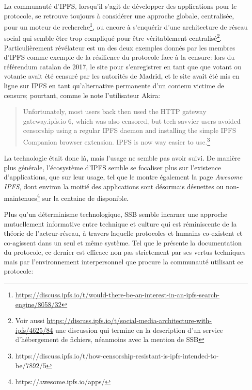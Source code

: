 \documentclass{article}
\begin{document}
La communauté d'IPFS, lorsqu'il s'agit de développer des applications pour le protocole, se retrouve toujours à considérer une approche globale, centralisée, pour un moteur de recherche\footnote{\url{https://discuss.ipfs.io/t/would-there-be-an-interest-in-an-ipfs-search-engine/8058/32}}, ou encore à s'enquérir d'une architecture de réseau social qui semble être trop compliqué pour être véritablement centralisé\footnote{Voir aussi \url{https://discuss.ipfs.io/t/social-media-architecture-with-ipfs/4625/84} une discussion qui termine en la description d'un service d'hébergement de fichiers, néanmoins avec la mention de SSB}. Particulièrement révélateur est un des deux exemples donnés par les membres d'IPFS comme exemple de la résilience du protocole face à la censure: lors du référendum catalan de 2017, le site pour s'enregistrer en tant que que votant ou votante avait été censuré par les autorités de Madrid, et le site avait été mis en ligne sur IPFS en tant qu'alternative permanente d'un contenu victime de censure; pourtant, comme le note l'utilisateur Akira:

\begin{quote}
    Unfortunately, most users back then used the HTTP gateway gateway.ipfs.io 6, which was also censored, but tech-savvier users avoided censorship using a regular IPFS daemon and installing the simple IPFS Companion browser extension. IPFS is now way easier to use.\footnote{https://discuss.ipfs.io/t/how-censorship-resistant-is-ipfs-intended-to-be/7892/5}
\end{quote}

La technologie était donc là, mais l'usage ne semble pas avoir suivi. De manière plus générale, l'écosystème d'IPFS semble se focaliser plus sur l'existence d'applications, que sur leur usage, tel que le montre également la page \emph{Awesome IPFS}, dont environ la moitié des applications sont désormais désuettes ou non-maintenues\footnote{https://awesome.ipfs.io/apps/} sur la centaine de disponible. %

Plus qu'un déterminisme technologique, SSB semble incarner une approche mutuellement informative entre technique et culture qui est réminiscente de la théorie de l'acteur-réseau, à travers laquelle protocoles et humains co-existent et co-agissent dans un seul et même système\cite{latour_reassembling_2005}. Tel que le présente la documentation du protocole, ce dernier est efficace non pas strictement par ses vertus techniques mais par l'environnement interpersonnel que procure la communauté utilisant ce protocole:
\end{document}
